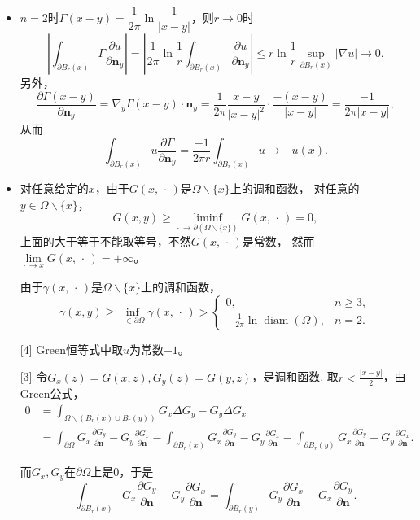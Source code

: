\begin{itemize}
    \item[1.] $n=2$时$\varGamma(x-y)=\dfrac{1}{2\pi}\ln\dfrac{1}{|x-y|}$，则$r\to0$时
    \[\left|\int_{\partial B_r(x)}\varGamma\frac{\partial u}{\partial\boldsymbol{n}_y}\right|
    =\left|\frac{1}{2\pi}\ln\frac{1}{r}\int_{\partial B_r(x)}\frac{\partial u}{\partial\boldsymbol{n}_y}\right|
    \leqslant r\ln\frac{1}{r}\sup_{\partial B_r(x)}|\nabla u|\to0.\]
    另外，
    \[\frac{\partial\varGamma(x-y)}{\partial\boldsymbol{n}_y}
    =\nabla_y\varGamma(x-y)\cdot\boldsymbol{n}_y
    =\frac{1}{2\pi}\frac{x-y}{|x-y|^2}\cdot\frac{-(x-y)}{|x-y|}
    =\frac{-1}{2\pi|x-y|},\]
    从而
    \[\int_{\partial B_r(x)}u\frac{\partial\varGamma}{\partial\boldsymbol{n}_y}
    =\frac{-1}{2\pi r}\int_{\partial B_r(x)}u\to-u(x).\]
    
    \item[2.] 
    [2] 对任意给定的$x$，由于$G(x,\,\cdot\,)$是$\varOmega\backslash\{x\}$上的调和函数，
    对任意的$y\in\varOmega\backslash\{x\}$，
    $$G(x,y)\geqslant\liminf_{\cdot\,\to\partial(\varOmega\backslash\{x\})}
    G(x,\,\cdot\,)=0,$$
    上面的大于等于不能取等号，不然$G(x,\,\cdot\,)$是常数，
    然而$\lim\limits_{\cdot\,\to x}G(x,\,\cdot\,)=+\infty$。

    由于$\gamma(x,\,\cdot\,)$是$\varOmega\backslash\{x\}$上的调和函数，
    $$\gamma(x,y)\geqslant\inf_{\cdot\,\in\partial\varOmega}\gamma(x,\,\cdot\,)>
    \begin{cases}0,&n\geqslant3,\\
        -\frac{1}{2\pi}\ln\operatorname{diam}(\varOmega),&n=2.\end{cases}$$

    [4] Green恒等式中取$u$为常数$-1$。
    
    [3] 令$G_x(z)=G(x,z),G_y(z)=G(y,z)$，是调和函数.
    取$r<\frac{|x-y|}{2}$，由Green公式，
    \begin{align*}0&=\int_{\varOmega\backslash(B_r(x)\cup B_r(y))}G_x\Delta G_y-G_y\Delta G_x\\
    &=\int_{\partial\varOmega}G_x\frac{\partial G_y}{\partial\boldsymbol{n}}-G_y\frac{\partial G_x}{\partial\boldsymbol{n}}
    -\int_{\partial B_r(x)}G_x\frac{\partial G_y}{\partial\boldsymbol{n}}-G_y\frac{\partial G_x}{\partial\boldsymbol{n}}
    -\int_{\partial B_r(y)}G_x\frac{\partial G_y}{\partial\boldsymbol{n}}-G_y\frac{\partial G_x}{\partial\boldsymbol{n}}.\end{align*}

    而$G_x,G_y$在$\partial\varOmega$上是$0$，于是
    $$\int_{\partial B_r(x)}G_x\frac{\partial G_y}{\partial\boldsymbol{n}}-G_y\frac{\partial G_x}{\partial\boldsymbol{n}}
    =\int_{\partial B_r(y)}G_y\frac{\partial G_x}{\partial\boldsymbol{n}}-G_x\frac{\partial G_y}{\partial\boldsymbol{n}}.\tag{$*$}$$


\end{itemize}
